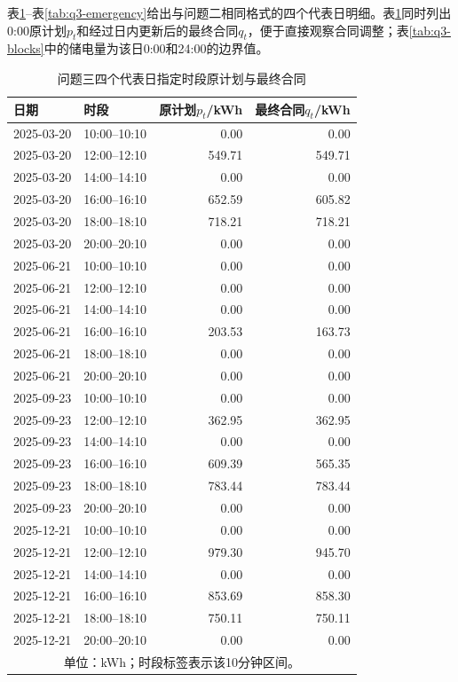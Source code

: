 \documentclass[UTF8,12pt,a4paper]{ctexart}
\theoremstyle{remark}
\begin{document}
表\ref{tab:q3-selected}--表\ref{tab:q3-emergency}给出与问题二相同格式的四个代表日明细。表\ref{tab:q3-selected}同时列出0:00原计划$p_t$和经过日内更新后的最终合同$q_t$，便于直接观察合同调整；表\ref{tab:q3-blocks}中的储电量为该日0:00和24:00的边界值。
\begin{table}[H]\centering\scriptsize
\caption{问题三四个代表日指定时段原计划与最终合同}\label{tab:q3-selected}
\begin{tabular}{llrr}\toprule 日期&时段&原计划$p_t$/kWh&最终合同$q_t$/kWh\\\midrule
2025-03-20&10:00--10:10&0.00&0.00\\
2025-03-20&12:00--12:10&549.71&549.71\\
2025-03-20&14:00--14:10&0.00&0.00\\
2025-03-20&16:00--16:10&652.59&605.82\\
2025-03-20&18:00--18:10&718.21&718.21\\
2025-03-20&20:00--20:10&0.00&0.00\\
2025-06-21&10:00--10:10&0.00&0.00\\
2025-06-21&12:00--12:10&0.00&0.00\\
2025-06-21&14:00--14:10&0.00&0.00\\
2025-06-21&16:00--16:10&203.53&163.73\\
2025-06-21&18:00--18:10&0.00&0.00\\
2025-06-21&20:00--20:10&0.00&0.00\\
2025-09-23&10:00--10:10&0.00&0.00\\
2025-09-23&12:00--12:10&362.95&362.95\\
2025-09-23&14:00--14:10&0.00&0.00\\
2025-09-23&16:00--16:10&609.39&565.35\\
2025-09-23&18:00--18:10&783.44&783.44\\
2025-09-23&20:00--20:10&0.00&0.00\\
2025-12-21&10:00--10:10&0.00&0.00\\
2025-12-21&12:00--12:10&979.30&945.70\\
2025-12-21&14:00--14:10&0.00&0.00\\
2025-12-21&16:00--16:10&853.69&858.30\\
2025-12-21&18:00--18:10&750.11&750.11\\
2025-12-21&20:00--20:10&0.00&0.00\\\bottomrule
\multicolumn{4}{c}{单位：kWh；时段标签表示该10分钟区间。}\end{tabular}\end{table}
\end{document}
